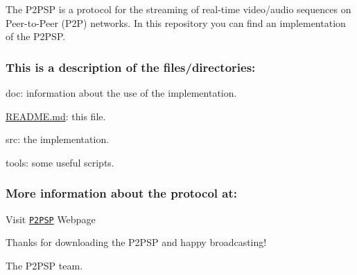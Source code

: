 The P2\+P\+S\+P is a protocol for the streaming of real-\/time video/audio sequences on Peer-\/to-\/\+Peer (P2\+P) networks. In this repository you can find an implementation of the P2\+P\+S\+P.

\subsubsection*{This is a description of the files/directories\+:}


\begin{DoxyItemize}
\item doc\+: information about the use of the implementation.
\item \hyperlink{README_8md}{R\+E\+A\+D\+M\+E.\+md}\+: this file.
\item src\+: the implementation.
\item tools\+: some useful scripts.
\end{DoxyItemize}

\subsubsection*{More information about the protocol at\+:}


\begin{DoxyItemize}
\item Visit \href{http://www.p2psp.org}{\tt P2\+P\+S\+P} Webpage
\end{DoxyItemize}

Thanks for downloading the P2\+P\+S\+P and happy broadcasting!

The P2\+P\+S\+P team. 